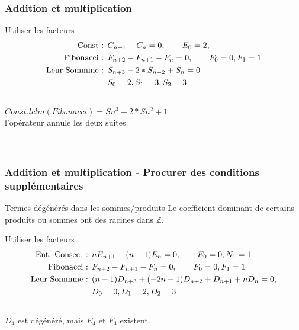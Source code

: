 \documentclass{beamer}
\begin{document}


\begin{frame}
\frametitle{Addition et multiplication}
\begin{center}
\begin{exampleblock}{Utiliser les facteurs}
    \begin{align*}
        \textnormal{Const : } &C_{n+1} - C_n = 0,\qquad E_0 = 2,\\
        \textnormal{Fibonacci : } &F_{n+2} - F_{n+1} - F_n = 0,\qquad F_0=0, F_1=1\\
        \textnormal{Leur Sommme : } &S_{n+3} - 2*S_{n+2} + S_n = 0 \\
        &S_0 = 2, S_1 = 3, S_2 = 3\\
    \end{align*}\\
    $Const.lclm(Fibonacci)= Sn^3 - 2*Sn^2 + 1  $\\
    l'opérateur annule les deux suites\\
    [0, 1, 1, 2, 3, 5, 8, 13, 21, 34,...]\\
    [2, 2, 2, 2, 2, 2, 2, 2, 2, 2,..]\\
\end{exampleblock}
\end{center}
\end{frame}

\begin{frame}
\frametitle{Addition et multiplication - Procurer des conditions supplémentaires}
\begin{center}
\begin{alertblock}{Termes dégénérés dans les sommes/produits}
    Le coefficient dominant de certains produits ou sommes ont des racines dans $\mathbb Z$.
\end{alertblock}
\begin{exampleblock}{Utiliser les facteurs}
    \begin{align*}
        \textnormal{Ent. Consec. : } &nE_{n+1} - (n+1)E_n = 0,\qquad E_0 = 0, N_1 = 1\\
        \textnormal{Fibonacci : } &F_{n+2} - F_{n+1} - F_n = 0,\qquad F_0=0, F_1=1\\
        \textnormal{Leur Sommme : } &(n - 1)D_{n+3} + (-2n + 1)D_{n+2} + D_{n+1} + nD_n = 0, \\
        &D_0 = 0, D_1 = 2, D_2 = 3\\
    \end{align*}\\
    \vspace{-0.7cm}
    $D_4$ est dégénéré, mais $E_4$ et $F_4$ existent.
\end{exampleblock}
\end{center}
\end{frame}
\end{document}
